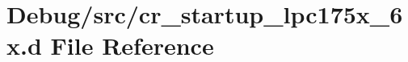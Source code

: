 \hypertarget{cr__startup__lpc175x__6x_8d}{}\section{Debug/src/cr\+\_\+startup\+\_\+lpc175x\+\_\+6x.d File Reference}
\label{cr__startup__lpc175x__6x_8d}
